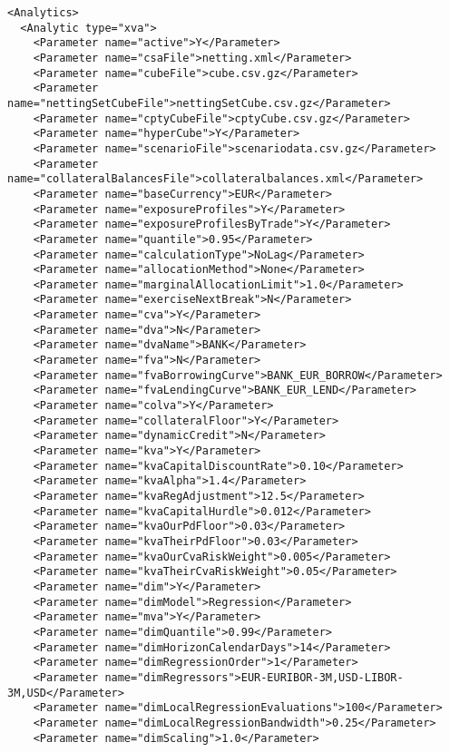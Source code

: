 {\begin{listing}[H]
\begin{verbatim}
<Analytics>
  <Analytic type="xva">
    <Parameter name="active">Y</Parameter>
    <Parameter name="csaFile">netting.xml</Parameter>
    <Parameter name="cubeFile">cube.csv.gz</Parameter>
    <Parameter name="nettingSetCubeFile">nettingSetCube.csv.gz</Parameter>
    <Parameter name="cptyCubeFile">cptyCube.csv.gz</Parameter>
    <Parameter name="hyperCube">Y</Parameter>
    <Parameter name="scenarioFile">scenariodata.csv.gz</Parameter>
    <Parameter name="collateralBalancesFile">collateralbalances.xml</Parameter>
    <Parameter name="baseCurrency">EUR</Parameter>
    <Parameter name="exposureProfiles">Y</Parameter>
    <Parameter name="exposureProfilesByTrade">Y</Parameter>
    <Parameter name="quantile">0.95</Parameter>
    <Parameter name="calculationType">NoLag</Parameter>      
    <Parameter name="allocationMethod">None</Parameter>    
    <Parameter name="marginalAllocationLimit">1.0</Parameter>
    <Parameter name="exerciseNextBreak">N</Parameter>
    <Parameter name="cva">Y</Parameter>
    <Parameter name="dva">N</Parameter>
    <Parameter name="dvaName">BANK</Parameter>
    <Parameter name="fva">N</Parameter>
    <Parameter name="fvaBorrowingCurve">BANK_EUR_BORROW</Parameter>
    <Parameter name="fvaLendingCurve">BANK_EUR_LEND</Parameter>
    <Parameter name="colva">Y</Parameter>
    <Parameter name="collateralFloor">Y</Parameter>
    <Parameter name="dynamicCredit">N</Parameter>
    <Parameter name="kva">Y</Parameter>
    <Parameter name="kvaCapitalDiscountRate">0.10</Parameter>
    <Parameter name="kvaAlpha">1.4</Parameter>
    <Parameter name="kvaRegAdjustment">12.5</Parameter>
    <Parameter name="kvaCapitalHurdle">0.012</Parameter>
    <Parameter name="kvaOurPdFloor">0.03</Parameter>
    <Parameter name="kvaTheirPdFloor">0.03</Parameter>
    <Parameter name="kvaOurCvaRiskWeight">0.005</Parameter>
    <Parameter name="kvaTheirCvaRiskWeight">0.05</Parameter>
    <Parameter name="dim">Y</Parameter>
    <Parameter name="dimModel">Regression</Parameter>
    <Parameter name="mva">Y</Parameter>
    <Parameter name="dimQuantile">0.99</Parameter>
    <Parameter name="dimHorizonCalendarDays">14</Parameter>
    <Parameter name="dimRegressionOrder">1</Parameter>
    <Parameter name="dimRegressors">EUR-EURIBOR-3M,USD-LIBOR-3M,USD</Parameter>
    <Parameter name="dimLocalRegressionEvaluations">100</Parameter>
    <Parameter name="dimLocalRegressionBandwidth">0.25</Parameter>
    <Parameter name="dimScaling">1.0</Parameter>

\end{verbatim}
\end{listing}}
